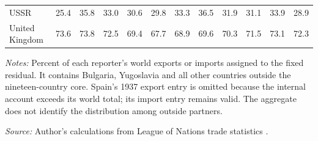 \begin{landscape}
\begin{table}[!htbp]
\begin{threeparttable}
\begin{tabular}{@{}lrrrrrrrrrrr@{}}
USSR & 25.4 & 35.8 & 33.0 & 30.6 & 29.8 & 33.3 & 36.5 & 31.9 & 31.1 & 33.9 & 28.9 \\
United Kingdom & 73.6 & 73.8 & 72.5 & 69.4 & 67.7 & 68.9 & 69.6 & 70.3 & 71.5 & 73.1 & 72.3 \\
\bottomrule
\end{tabular}
\begin{tablenotes}[flushleft]\footnotesize\item \textit{Notes:} Percent of each reporter's world exports or imports assigned to the fixed \External{} residual. It contains Bulgaria, Yugoslavia and all other countries outside the nineteen-country core. Spain's 1937 export entry is omitted because the internal account exceeds its world total; its import entry remains valid. The aggregate does not identify the distribution among outside partners.
\item \textit{Source:} Author's calculations from League of Nations trade statistics \parencite{league1930,league1936,league1938}.
\end{tablenotes}\end{threeparttable}\end{table}
\end{landscape}\clearpage
